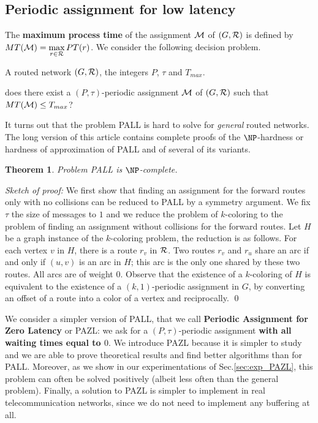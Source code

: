 \documentclass[10pt, conference, letterpaper]{IEEEtran}
\newtheorem{theorem}{Theorem}
\newcommand{\todo}[1]{{\color{red} TODO: {#1}}}
\begin{document}
      
      \subsection{Periodic assignment for low latency}
      
      
    The {\bf maximum process time} of the assignment ${\cal M}$ of $(G,{\cal R})$ is defined by $MT({\cal M})=\max\limits_{r \in {\cal R}} PT(r)$. We consider the following decision problem.


        A routed network $(G,{\cal R})$, the integers $P$, $\tau$ and $T_{max}$.

       does there exist a $(P,\tau)$-periodic assignment ${\cal M}$ of $(G,{\cal R})$ such that $MT({\cal M}) \leq T_{max}$?

      It turns out that the problem PALL is hard to solve for \emph{general} routed networks. The long version of this article contains complete proofs of the $\NP$-hardness or hardness of approximation of PALL and of several of its variants.

 \begin{theorem}
Problem PALL is $\NP$-complete.
\end{theorem}

\noindent \emph{Sketch of proof:}
 We first show that finding an assignment for the forward routes only with no collisions 
 can be reduced to PALL by a symmetry argument.
 We fix $\tau$ the size of messages to $1$ and we reduce the problem of $k$-coloring to the 
 problem of finding an assignment without collisions for the forward routes.
 Let $H$ be a graph instance of the $k$-coloring problem, the reduction is as follows. 
 For each vertex $v$ in $H$, there is a route $r_v$ in ${\cal R}$. Two routes $r_v$ and $r_u$ share an arc if and only if $(u,v)$ is an arc in $H$; this arc is the only one shared by these two routes. All arcs are of weight $0$. 
 Observe that the existence of a $k$-coloring of $H$ is equivalent to the existence of a $(k,1)$-periodic assignment in $G$, 
 by converting an offset of a route into a color of a vertex and reciprocally. \qed
     
     


       We consider a simpler version of PALL, that we call {\bf Periodic Assignment for Zero Latency} or PAZL: we ask for a $(P,\tau)$-periodic assignment {\bf with all waiting times equal to $0$}. We introduce PAZL because it is simpler to study and we are able to prove theoretical results and find better algorithms than for PALL. Moreover, as we show in our experimentations of Sec.\ref{sec:exp_PAZL}, this problem can often be solved positively (albeit less often than the general problem). Finally, a solution to PAZL is simpler to implement in real telecommunication networks, since we do not need to implement any buffering at all.    
       
\end{document}
